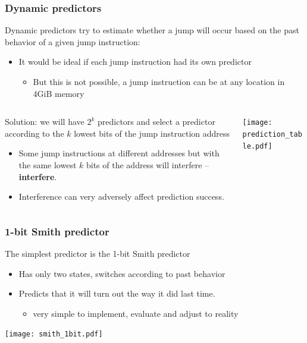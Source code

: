 \documentclass{beamer}
\begin{document}
\begin{frame}
\frametitle{Dynamic predictors}

\small
Dynamic predictors try to estimate whether a jump will occur based on the past behavior of a given jump instruction:
\begin{itemize}
\item It would be ideal if each jump instruction had its own predictor
\begin{itemize}
\small
\item But this is not possible, a jump instruction can be at any location in 4GiB memory
\end{itemize}
\end{itemize}


\begin{columns}[T]
\begin{column}{0.5\textwidth}
\small
Solution: we will have $2^k$ predictors and select a predictor according to the $k$ lowest bits of the jump instruction address
\begin{itemize}
\item Some jump instructions at different addresses but with the same lowest $k$ bits of the address will interfere -- \textbf{interfere}.
\item Interference can very adversely affect prediction success.
\end{itemize}
\end{column}
\begin{column}{0.5\textwidth}
\texttt{[image: prediction\_table.pdf]}
\end{column}
\end{columns}

\end{frame}


\begin{frame}
\frametitle{1-bit Smith predictor}

The simplest predictor is the 1-bit Smith predictor
\begin{itemize}
\item Has only two states, switches according to past behavior
\item Predicts that it will turn out the way it did last time.
\begin{itemize}
\item very simple to implement, evaluate and adjust to reality
\end{itemize}
\end{itemize}

\begin{center}
\texttt{[image: smith\_1bit.pdf]}
\end{center}

\end{frame}
\end{document}
